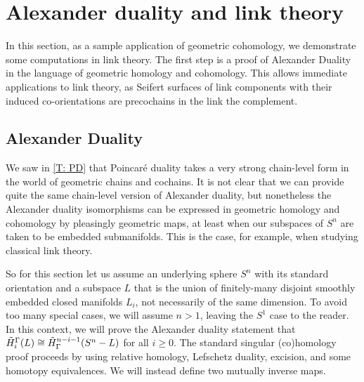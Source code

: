 
\section{Alexander duality and link theory}\label{S: Alexander}

In this section, as a sample application of geometric cohomology, we demonstrate some computations in link theory.
The first step is a proof of Alexander Duality in the language of geometric homology and cohomology.
This allows immediate applications to link theory, as Seifert surfaces of link components with their induced co-orientations are precochains in the link the complement.


\subsection{Alexander Duality}


We saw in \cref{T: PD} that Poincar\'e duality takes a very strong chain-level form in the world of geometric chains and cochains.
It is not clear that we can provide quite the same chain-level version of Alexander duality, but nonetheless the Alexander duality isomorphisms can be expressed in geometric homology and cohomology by pleasingly geometric maps, at least when our subspaces of $S^n$ are taken to be embedded submanifolds.
This is the case, for example, when studying classical link theory.

So for this section let us assume an underlying sphere $S^n$ with its standard orientation and a subspace $L$ that is the union of finitely-many disjoint smoothly embedded closed manifolds $L_i$, not necessarily of the same dimension.
To avoid too many special cases, we will assume $n>1$, leaving the $S^1$ case to the reader.
In this context, we will prove the Alexander duality statement that $\tilde H_i^\Gamma(L) \cong \tilde H^{n-i-1}_\Gamma(S^n-L)$ for all $i \geq 0$.
The standard singular (co)homology proof proceeds by using relative homology, Lefschetz duality, excision, and some homotopy equivalences. We will instead define two mutually inverse maps.




